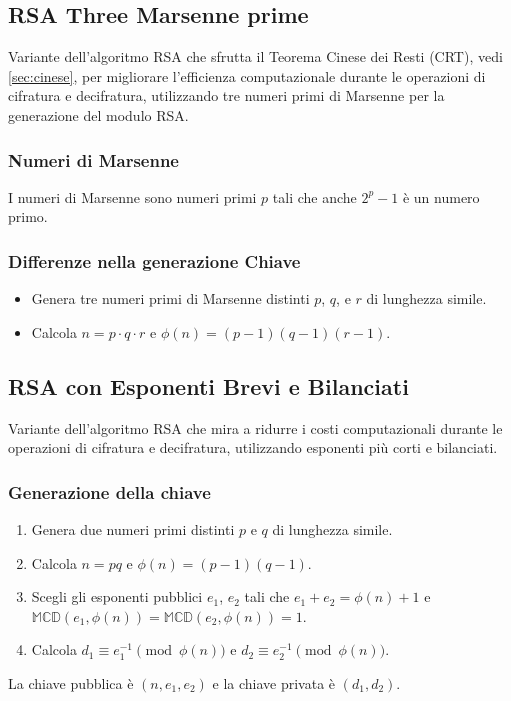 \documentclass[a4paper,12pt]{report}
\begin{document}
\subsection{RSA Three Marsenne prime} \cite{padmaja2016}
Variante dell'algoritmo RSA che sfrutta il Teorema Cinese dei Resti (CRT), vedi \ref{sec:cinese}, per migliorare l'efficienza computazionale durante le operazioni di cifratura e decifratura, utilizzando tre numeri primi di Marsenne per la generazione del modulo RSA.

\subsubsection*{Numeri di Marsenne}
I numeri di Marsenne sono numeri primi \(p\) tali che anche \(2^p - 1\) è un numero primo. 

\subsubsection*{Differenze nella generazione Chiave}
\begin{itemize}
    \item Genera tre numeri primi di Marsenne distinti $p$, $q$, e $r$ di lunghezza simile.
    \item Calcola $n = p \cdot q \cdot r$ e $\phi(n) = (p-1)(q-1)(r-1)$.
\end{itemize}

\subsection{RSA con Esponenti Brevi e Bilanciati} \cite{10.1007/978-3-540-30580-4_14}
Variante dell'algoritmo RSA che mira a ridurre i costi computazionali durante le operazioni di cifratura e decifratura, utilizzando esponenti più corti e bilanciati.

\subsubsection*{Generazione della chiave}
\begin{enumerate}
    \item Genera due numeri primi distinti $p$ e $q$ di lunghezza simile.
    \item Calcola $n = pq$ e $\phi(n) = (p-1)(q-1)$.
    \item Scegli gli esponenti pubblici $e_1$, $e_2$ tali che $e_1 + e_2 = \phi(n) + 1$ e $\mathbb{MCD}(e_1, \phi(n)) = \mathbb{MCD}(e_2, \phi(n)) = 1$.
    \item Calcola $d_1 \equiv e_1^{-1} \pmod{\phi(n)}$ e $d_2 \equiv e_2^{-1} \pmod{\phi(n)}$.
\end{enumerate}
La chiave pubblica è $(n, e_1, e_2)$ e la chiave privata è $(d_1, d_2)$.
\end{document}
